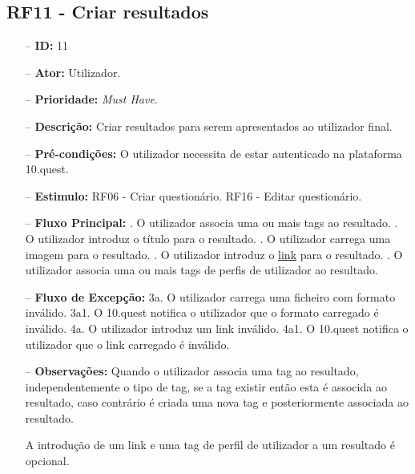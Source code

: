 \subsection{RF11 - Criar resultados}
\begin{itemize}
	\item[--] \textbf{ID:} 11
	\item[--]  \textbf{Ator:} Utilizador.
	\item[--]  \textbf{Prioridade:} \textit{Must Have}.
	\item[--]  \textbf{Descrição:} Criar resultados para serem apresentados ao utilizador final.
	\item[--]  \textbf{Pré-condições:} O utilizador necessita de estar autenticado na plataforma 10.quest.
	\item[--]  \textbf{Estimulo:}  
		\subitem RF06 - Criar questionário.
		\subitem RF16 - Editar questionário.
	\item[--]  \textbf{Fluxo Principal:} 
		. O utilizador associa uma ou mais tags ao resultado.
		. O utilizador introduz o título para o resultado.
		. O utilizador carrega uma imagem para o resultado.
		. O utilizador introduz o \underline{link} para o resultado.
		. O utilizador associa uma ou mais tags de perfis de utilizador ao resultado.		
	\item[--]  \textbf{Fluxo de Excepção:} 
		\subitem 3a. O utilizador carrega uma ficheiro com formato inválido.
		\subitem 3a1. O 10.quest notifica o utilizador que o formato carregado é inválido.
		\subitem 4a. O utilizador introduz um link inválido.
		\subitem 4a1. O 10.quest notifica o utilizador que o link carregado é inválido.
	\item[--]  \textbf{Observações:} 
	Quando o utilizador associa uma tag ao resultado, independentemente o tipo de tag, se a tag existir então esta é associda ao resultado, caso contrário é criada uma nova tag e posteriormente associada ao resultado.
	
	A introdução de um link e uma tag de perfil de utilizador a um resultado é opcional.	
	
\end{itemize}
\newpage

